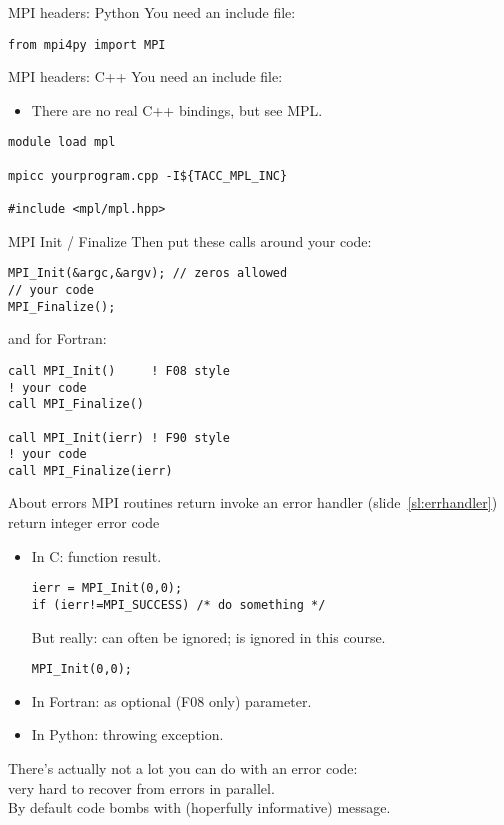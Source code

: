 \begin{numberedframe}{MPI headers: Python}
\label{sl:mpi-header-p}
You need an include file:
\begin{verbatim}
from mpi4py import MPI
\end{verbatim}
\end{numberedframe}

\begin{numberedframe}{MPI headers: C++}
\label{sl:mpi-header-cpp}
You need an include file:
\begin{itemize}
\item There are no real C++ bindings, but see MPL.
\end{itemize}
\begin{verbatim}
module load mpl

mpicc yourprogram.cpp -I${TACC_MPL_INC}

#include <mpl/mpl.hpp>
\end{verbatim}
\end{numberedframe}

\begin{numberedframe}{MPI Init / Finalize}
Then put these calls around your code:
\lstset{language=C}
\begin{lstlisting}
MPI_Init(&argc,&argv); // zeros allowed
// your code
MPI_Finalize();  
\end{lstlisting}
and for Fortran:
\lstset{language=Fortran}
\begin{lstlisting}
call MPI_Init()     ! F08 style
! your code
call MPI_Finalize()

call MPI_Init(ierr) ! F90 style
! your code
call MPI_Finalize(ierr)
\end{lstlisting}
\end{numberedframe}

\begin{numberedframe}{About errors}
  MPI routines return invoke an error handler (slide~\ref{sl:errhandler})\\
  return integer error code
  \begin{itemize}
  \item In C: function result. 
\lstset{language=C++}
\begin{lstlisting}
ierr = MPI_Init(0,0);
if (ierr!=MPI_SUCCESS) /* do something */
\end{lstlisting}
  But really: can often be ignored; is ignored in this course.
\begin{lstlisting}
MPI_Init(0,0);
\end{lstlisting}
  \item In Fortran: as optional (F08 only) parameter.
  \item In Python: throwing exception.
  \end{itemize}
  There's actually not a lot you can do with an error code:\\
  very hard to recover from errors in parallel.\\
  By default code bombs with (hoperfully informative) message.
\end{numberedframe}

